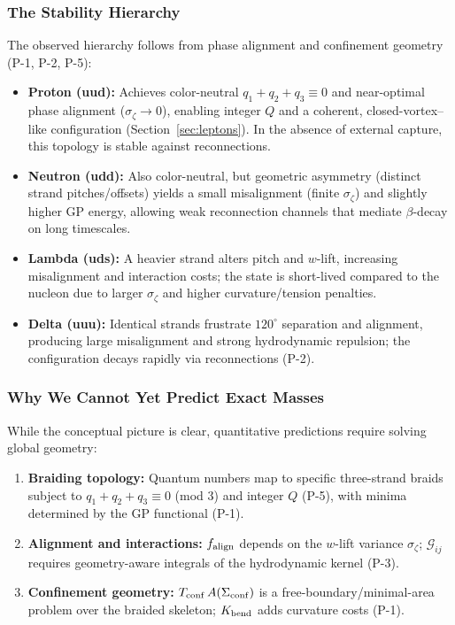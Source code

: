 \subsubsection{The Stability Hierarchy}

The observed hierarchy follows from phase alignment and confinement geometry (P-1, P-2, P-5):

\begin{itemize}
\item \textbf{Proton (uud):} Achieves color-neutral $q_1{+}q_2{+}q_3\equiv0$ and near-optimal phase alignment ($\sigma_\zeta\!\to\!0$), enabling integer $Q$ and a coherent, closed-vortex–like configuration (Section~\ref{sec:leptons}). In the absence of external capture, this topology is stable against reconnections.
\item \textbf{Neutron (udd):} Also color-neutral, but geometric asymmetry (distinct strand pitches/offsets) yields a small misalignment (finite $\sigma_\zeta$) and slightly higher GP energy, allowing weak reconnection channels that mediate $\beta$-decay on long timescales.
\item \textbf{Lambda (uds):} A heavier strand alters pitch and $w$-lift, increasing misalignment and interaction costs; the state is short-lived compared to the nucleon due to larger $\sigma_\zeta$ and higher curvature/tension penalties.
\item \textbf{Delta (uuu):} Identical strands frustrate $120^\circ$ separation and alignment, producing large misalignment and strong hydrodynamic repulsion; the configuration decays rapidly via reconnections (P-2).
\end{itemize}

\subsubsection{Why We Cannot Yet Predict Exact Masses}

While the conceptual picture is clear, quantitative predictions require solving global geometry:

\begin{enumerate}
\item \textbf{Braiding topology:} Quantum numbers map to specific three-strand braids subject to $q_1{+}q_2{+}q_3\equiv 0$ (mod 3) and integer $Q$ (P-5), with minima determined by the GP functional (P-1).
\item \textbf{Alignment and interactions:} $f_{\rm align}$ depends on the $w$-lift variance $\sigma_\zeta$; $\mathcal{G}_{ij}$ requires geometry-aware integrals of the hydrodynamic kernel (P-3).
\item \textbf{Confinement geometry:} $T_{\rm conf}\,A(\Sigma_{\rm conf})$ is a free-boundary/minimal-area problem over the braided skeleton; $K_{\rm bend}$ adds curvature costs (P-1).
\end{enumerate}

